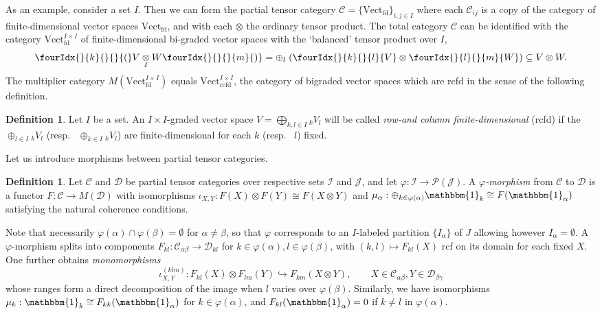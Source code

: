 \documentclass[10pt]{article}
\DeclareMathOperator{\fin}{\mathrm{fd}}
\DeclareMathOperator{\rcf}{\mathrm{rcfd}}
\newcommand{\CatC}{\mathcal{C}}
\newcommand{\CatD}{\mathcal{D}}
\newcommand{\CatCC}{\mathscr{C}}
\newcommand{\CatDD}{\mathscr{D}}
\newcommand{\Vectif}{\mathrm{Vect}^{I\times I}_{\fin}}
\newcommand{\Vectrcf}{\mathrm{Vect}^{I\times I}_{\rcf}}
\newcommand{\itimes}{\underset{I}{\otimes}}
\newcommand{\Vect}{\mathrm{Vect}}
\newcommand{\GrDA}[3]{{}_{#2}#1_{#3}} %
\newcommand{\Unitb}{\mathbbm{1}}
\newcommand{\Gr}[5]{\fourIdx{#2}{#4}{#3}{#5}{#1}}%
\newcommand{\Gru}[3]{\Gr{#1}{}{}{#2}{#3}}
\theoremstyle{definition}
\newtheorem{Def}[Theorem]{Definition}
\numberwithin{equation}{section}
\begin{document}
As an example, consider a set $I$. Then we can form the partial tensor category $\CatCC = \{\Vect_{\fin}\}_{i,j\in I}$ where each $\CatC_{ij}$ is a copy of the category of finite-dimensional vector spaces $\Vect_{\fin}$, and with each $\otimes$ the ordinary tensor product. The total category $\CatC$ can be identified with the category $\Vectif$ of finite-dimensional bi-graded vector spaces with the `balanced' tensor product over $I$,  \[\Gru{(}{k}{}V\itimes W\Gru{)}{}{m} = \oplus_l \;(\Gru{V}{k}{l}\otimes \Gru{W}{l}{m})\subseteq V\otimes W.\] The multiplier category $M(\Vectif)$ equals $\Vectrcf$, the category of bigraded vector spaces which are rcfd in the sense of the following definition.

\begin{Def}\label{Defrcfd} Let $I$ be a set. An $I\times I$-graded vector space $V=\bigoplus_{k,l\in I} \GrDA{V}{k}{l}$ will be called \emph{row-and column finite-dimensional} (rcfd) if the $\oplus_{l\in I} \GrDA{V}{k}{l}$ (resp.~ $\oplus_{k\in I} \GrDA{V}{k}{l}$) are finite-dimensional for each $k$ (resp.~ $l$) fixed. 
\end{Def} 

Let us introduce morphisms between partial tensor categories.

\begin{Def} Let $\CatCC$ and $\CatDD$ be partial tensor categories over respective sets $\mathscr{I}$ and $\mathscr{J}$, and let $\varphi: \mathscr{I}\rightarrow \mathscr{P}(\mathscr{J})$. A \emph{$\varphi$-morphism} from $\mathscr{C}$ to $\mathscr{D}$ is a functor $F:\CatC \rightarrow M(\CatD)$ with isomorphisms $\iota_{X,Y}:F(X)\otimes F(Y)\cong F(X\otimes Y)$ and $\mu_\alpha:\oplus_{k\in \varphi(\alpha)} \Unitb_k \cong F(\Unitb_\alpha)$ satisfying the natural coherence conditions. 
\end{Def}

Note that necessarily $\varphi(\alpha)\cap \varphi(\beta)=\emptyset$ for
$\alpha\neq \beta$, so that $\varphi$ corresponds to an $I$-labeled
partition $\{I_{\alpha}\}$ of $J$ allowing however $I_{\alpha}=\emptyset$.  A $\varphi$-morphism splits into components $F_{kl}:
\CatC_{\alpha\beta} \rightarrow \CatD_{kl}$ for $k\in\varphi(\alpha),l\in
\varphi(\beta)$, with $(k,l)\mapsto F_{kl}(X)$ rcf on its domain for each
fixed $X$. One further obtains
\emph{monomorphisms} \[\iota^{(klm)}_{X,Y}:F_{kl}(X) \otimes F_{lm}(Y)
\hookrightarrow F_{km}(X\otimes Y), \qquad X\in
\CatC_{\alpha\beta},Y\in \CatD_{\beta\gamma}\] whose ranges form a
direct decomposition of the image when $l$ varies over
$\varphi(\beta)$. Similarly, we have isomorphisms $\mu_{k}: \Unitb_k
\cong F_ {kk}(\Unitb_{\alpha})$ for $k\in \varphi(\alpha)$, and
$F_{kl}(\Unitb_{\alpha})= 0$ if $k\neq l$ in $\varphi(\alpha)$.
\end{document}
